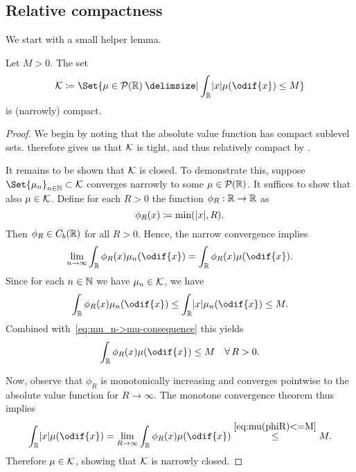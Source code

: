 \subsection{Relative compactness}\label{sec:compactness}


We start with a small helper lemma.

\begin{lemma}\label{lem:K-set-compact}
  Let \( M > 0 \).
  The set
  \begin{equation}
    \cK \coloneqq \Set{ \mu \in \cP(\bR) \given \int_\bR \abs{x} \mu(\odif{x}) \leq M }
  \end{equation}
  is (narrowly) compact.
\end{lemma}

\begin{proof}
  We begin by noting that the absolute value function has compact sublevel sets.
   therefore gives us that \( \mathcal{K} \) is tight, and thus relatively compact by .

  It remains to be shown that \( \mathcal{K} \) is closed.
  To demonstrate this, suppose \( \Set{\mu_n}_{n\in\bN} \subset \cK \) converges narrowly to some \( \mu \in \mathcal{P}(\mathbb{R}) \).
  It suffices to show that also \( \mu \in \mathcal{K} \).
  Define for each \( R > 0 \) the function \( \phi_R : \mathbb{R} \to \mathbb{R} \) as
  \begin{equation}
    \phi_R(x) \coloneqq \min(\lvert x\rvert, R).
  \end{equation}
  Then \( \phi_R \in C_b(\mathbb{R}) \) for all \( R > 0 \).
  Hence, the narrow convergence implies
  \begin{equation}\label{eq:mu_n->mu-consequence}
    \lim_{n\to\infty} \int_\bR \phi_R(x) \mu_n(\odif{x}) = \int_\bR \phi_R(x) \mu(\odif{x}).
  \end{equation}
  Since for each \( n \in \mathbb{N} \) we have \( \mu_n \in \mathcal{K} \), we have
  \begin{equation}
    \int_\bR \phi_R(x) \mu_n(\odif{x}) \leq \int_\bR \abs{x} \mu_n(\odif{x}) \leq M.
  \end{equation}
  Combined with~\eqref{eq:mu_n->mu-consequence} this yields
  \begin{equation}\label{eq:mu(phiR)<=M}
    \int_\bR \phi_R(x) \mu(\odif{x}) \leq M \quad \forall R > 0.
  \end{equation}

  Now, observe that \( \phi_R \) is monotonically increasing and converges pointwise to the absolute value function for \( R \to \infty \).
  The monotone convergence theorem thus implies
  \begin{equation}
    \int_\bR \abs{x} \mu(\odif{x})
    = \lim_{R\to\infty} \int_\bR \phi_R(x) \mu(\odif{x})
    \overset{\eqref{eq:mu(phiR)<=M}}{\leq} M.
  \end{equation}
  Therefore \( \mu \in \mathcal{K} \), showing that \( \mathcal{K} \) is narrowly closed.
\end{proof}

